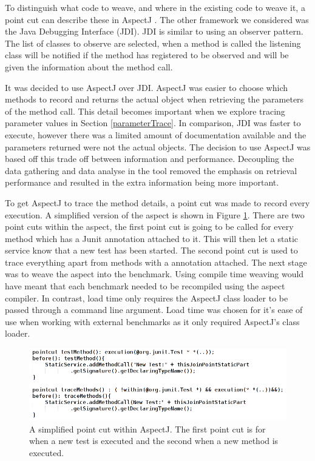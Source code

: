 To distinguish what code to weave, and where in the existing code to weave it, a point cut can describe these in AspectJ \cite{aspectj}. The other framework we considered was the Java Debugging Interface (JDI). JDI is similar to using an observer pattern. The list of classes to observe are selected, when a method is called the listening class will be notified if the method has registered to be observed and will be given the information about the method call. 

It was decided to use AspectJ over JDI. AspectJ was easier to choose which methods to record and returns the actual object when retrieving the parameters of the method call. This detail becomes important when we explore tracing parameter values in Section \ref{parameterTrace}. In comparison, JDI was faster to execute, however there was a limited amount of documentation available and the parameters returned were not the actual objects. The decision to use AspectJ was based off this trade off between information and performance. Decoupling the data gathering and data analyse in the tool removed the emphasis on retrieval performance and resulted in the extra information being more important.

To get AspectJ to trace the method details, a point cut was made to record every execution. A simplified version of the aspect is shown in Figure \ref{fig:aspectused}. There are two point cuts within the aspect, the first point cut is going to be called for every method which has a Junit \@Test annotation attached to it. This will then let a static service know that a new test has been started. The second point cut is used to trace everything apart from methods with a  \@Test annotation attached. The next stage was to weave the aspect into the benchmark. Using compile time weaving would have meant that each benchmark needed to be recompiled using the aspect compiler. In contrast, load time only requires the AspectJ class loader to be passed through a command line argument. Load time was chosen for it's ease of use when working with external benchmarks as it only required AspectJ's class loader.

\begin{figure}[h]
\begin{center}
\includegraphics[width = \textwidth]{aspect.png}
\end{center}
\caption{A simplified point cut within AspectJ. The first point cut is for when a new test is executed and the second when a new method is executed.}
\label{fig:aspectused}
\end{figure}

